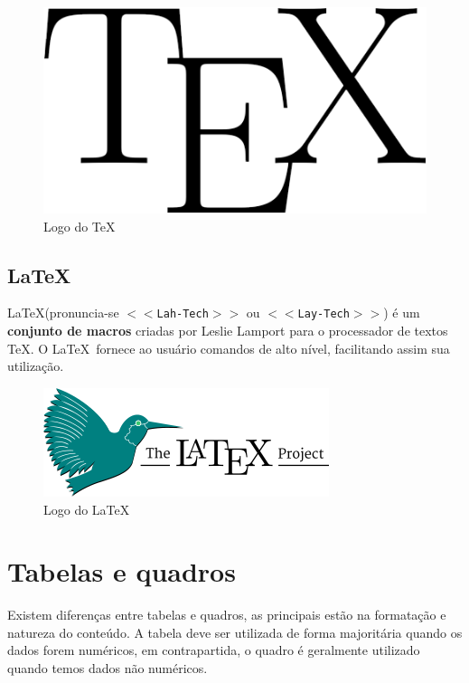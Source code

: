 \documentclass[
	12pt,    %
	oneside, %
	a4paper, %
	chapter=TITLE, %
	section=TITLE, %
	sumario=tradicional, %
	english, %
	brazil   %
] {abntex2}
\begin{document}
	\begin{figure}[htb]		
		\caption{Logo do \TeX}
		\label{tex-logo}
		\centering
		\includegraphics[scale=.2]{./figuras/tex-logo.png}
	\end{figure}
	
	\section{LaTeX}
	
	La\TeX(pronuncia-se \texttt{$<<$Lah-Tech$>>$} ou \texttt{$<<$Lay-Tech$>>$}) é um \textbf{conjunto de macros} criadas por Leslie Lamport para o processador de textos \TeX. O La\TeX \ fornece ao usuário comandos de alto nível, facilitando assim sua utilização.
	
	\begin{figure}[htb]		
		\caption{Logo do La\TeX}
		\label{latex-logo}
		\centering
		\includegraphics[scale=.5]{./figuras/latex-project-logo.png}
	\end{figure}	

	\chapter{Tabelas e quadros}\label{sec:tabelas}
	
    Existem diferenças entre tabelas e quadros, as principais estão na formatação e natureza do conteúdo. A tabela deve ser utilizada de forma majoritária quando os dados forem numéricos, em contrapartida, o quadro é geralmente utilizado quando temos dados não numéricos.
\end{document}
